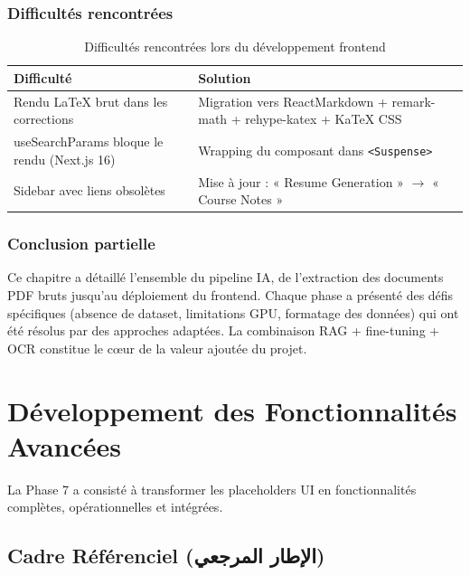 \documentclass[12pt,a4paper]{report}
\begin{document}
\subsection{Difficultés rencontrées}
\begin{table}[h!]
    \centering
    \begin{tabular}{p{6cm} p{8cm}}
        \toprule
        \textbf{Difficulté} & \textbf{Solution} \\
        \midrule
        Rendu LaTeX brut dans les corrections & Migration vers ReactMarkdown + remark-math + rehype-katex + KaTeX CSS \\
        useSearchParams bloque le rendu (Next.js 16) & Wrapping du composant dans \texttt{<Suspense>} \\
        Sidebar avec liens obsolètes & Mise à jour : « Resume Generation » $\rightarrow$ « Course Notes » \\
        \bottomrule
    \end{tabular}
    \caption{Difficultés rencontrées lors du développement frontend}
\end{table}

\subsection*{Conclusion partielle}
Ce chapitre a détaillé l'ensemble du pipeline IA, de l'extraction des documents PDF bruts jusqu'au déploiement du frontend. Chaque phase a présenté des défis spécifiques (absence de dataset, limitations GPU, formatage des données) qui ont été résolus par des approches adaptées. La combinaison RAG + fine-tuning + OCR constitue le cœur de la valeur ajoutée du projet.

\chapter{Développement des Fonctionnalités Avancées}

La Phase 7 a consisté à transformer les placeholders UI en fonctionnalités complètes, opérationnelles et intégrées.

\section{Cadre Référenciel (الإطار المرجعي)}
\end{document}
